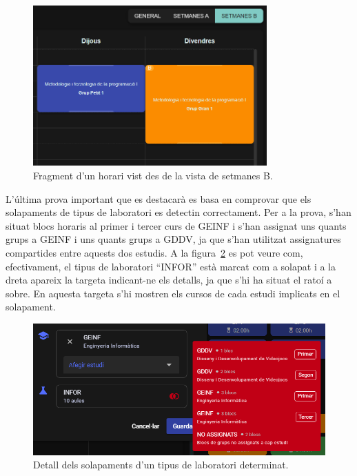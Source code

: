 \documentclass[a4paper,12pt]{ThesisStyle}
\begin{document}
\begin{figure}[H]
  \centering
  \includegraphics[width=0.8\textwidth]{assets/proves/setB.png}
  \caption{\label{img:setB} Fragment d'un horari vist des de la vista de setmanes B.}
\end{figure}

L'última prova important que es destacarà es basa en comprovar que els solapaments de tipus de laboratori es detectin correctament. Per a la prova, s'han situat blocs horaris al primer i tercer curs de GEINF i s'han assignat uns quants grups a GEINF i uns quants grups a GDDV, ja que s'han utilitzat assignatures compartides entre aquests dos estudis. A la figura~\ref{img:solapaments} es pot veure com, efectivament, el tipus de laboratori ``INFOR'' està marcat com a solapat i a la dreta apareix la targeta indicant-ne els detalls, ja que s'hi ha situat el ratoí a sobre. En aquesta targeta s'hi mostren els cursos de cada estudi implicats en el solapament.

\begin{figure}[H]
  \centering
  \includegraphics[width=\textwidth]{assets/proves/solapaments.png}
  \caption{\label{img:solapaments} Detall dels solapaments d'un tipus de laboratori determinat.}
\end{figure}
\end{document}
